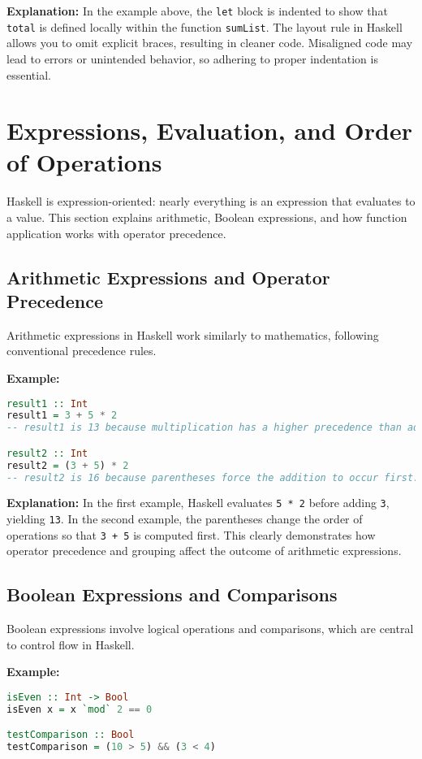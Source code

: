 \documentclass[11pt,a4paper]{article}
\begin{document}
\textbf{Explanation:}  
In the example above, the \texttt{let} block is indented to show that \texttt{total} is defined locally within the function \texttt{sumList}. The layout rule in Haskell allows you to omit explicit braces, resulting in cleaner code. Misaligned code may lead to errors or unintended behavior, so adhering to proper indentation is essential.

\section{Expressions, Evaluation, and Order of Operations}
Haskell is expression-oriented: nearly everything is an expression that evaluates to a value. This section explains arithmetic, Boolean expressions, and how function application works with operator precedence.

\subsection{Arithmetic Expressions and Operator Precedence}
Arithmetic expressions in Haskell work similarly to mathematics, following conventional precedence rules.

\textbf{Example:}
\begin{lstlisting}[language=Haskell]
result1 :: Int
result1 = 3 + 5 * 2
-- result1 is 13 because multiplication has a higher precedence than addition.

result2 :: Int
result2 = (3 + 5) * 2
-- result2 is 16 because parentheses force the addition to occur first.
\end{lstlisting}

\textbf{Explanation:}  
In the first example, Haskell evaluates \texttt{5 * 2} before adding \texttt{3}, yielding \texttt{13}. In the second example, the parentheses change the order of operations so that \texttt{3 + 5} is computed first. This clearly demonstrates how operator precedence and grouping affect the outcome of arithmetic expressions.

\subsection{Boolean Expressions and Comparisons}
Boolean expressions involve logical operations and comparisons, which are central to control flow in Haskell.

\textbf{Example:}
\begin{lstlisting}[language=Haskell]
isEven :: Int -> Bool
isEven x = x `mod` 2 == 0

testComparison :: Bool
testComparison = (10 > 5) && (3 < 4)
\end{lstlisting}
\end{document}
